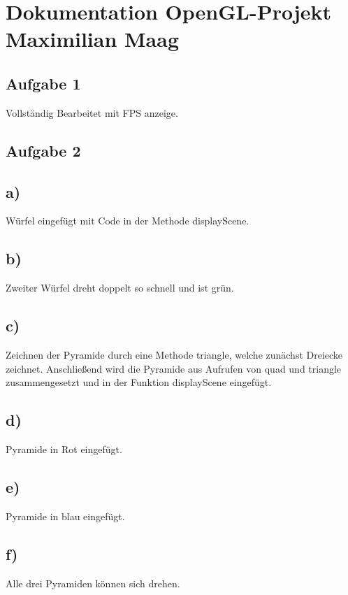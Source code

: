 \documentclass{article}
\begin{document}
	\section*{Dokumentation OpenGL-Projekt Maximilian Maag}
	\subsection*{Aufgabe 1}
	Vollständig Bearbeitet mit FPS anzeige.
	\subsection*{Aufgabe 2}
	\subsection*{a)}
	Würfel eingefügt mit Code in der Methode displayScene.
	\subsection*{b)}
	Zweiter Würfel dreht doppelt so schnell und ist grün.
	\subsection*{c)}
	Zeichnen der Pyramide durch eine Methode triangle, welche zunächst Dreiecke zeichnet. Anschließend wird die Pyramide aus Aufrufen von quad und triangle zusammengesetzt und in der Funktion displayScene eingefügt.
	\subsection*{d)}
	Pyramide in Rot eingefügt.
	\subsection*{e)}
	Pyramide in blau eingefügt.
	\subsection*{f)}
	Alle drei Pyramiden können sich drehen. 
\end{document}
